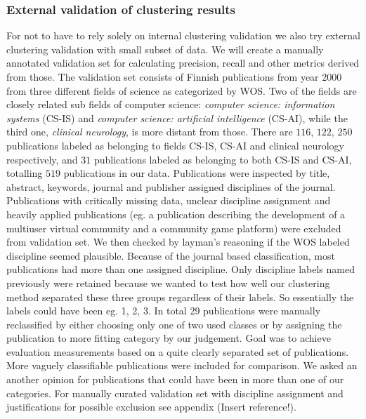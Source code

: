 \subsubsection{External validation of clustering results}
For not to have to rely solely on internal clustering validation we
also try external clustering validation with small subset of data.
We will create a manually annotated validation set for calculating
precision, recall and other metrics derived from those.
The validation set consists of Finnish publications from year 2000
from three different fields of science as categorized by WOS.
Two of the fields are closely related sub fields of computer
science: \emph{computer science: information systems} (CS-IS) and 
\emph{computer science: 
artificial intelligence} (CS-AI), while the third one, 
\emph{clinical neurology}, is more distant from those. There are 
$116$, $122$, $250$ publications labeled as belonging to fields 
CS-IS, CS-AI and clinical neurology respectively, and $31$ 
publications labeled as belonging to both CS-IS and CS-AI, 
totalling $519$ publications in our data.
Publications were inspected by title, abstract, keywords, journal
and publisher assigned disciplines of the journal. Publications
with critically missing data, unclear discipline assignment and
heavily applied publications (eg. a publication describing the 
development of a multiuser virtual community and a community game 
platform) were excluded from validation set. 
We then checked by layman's reasoning if the WOS labeled 
discipline seemed plausible. Because of the journal based 
classification, most publications had more than one 
assigned discipline. Only discipline labels named 
previously were retained because we wanted to test 
how well our clustering method separated these three 
groups regardless of their labels. So essentially the 
labels could have been eg. 1, 2, 3.
In total 29 publications were manually reclassified by either
choosing only one of two used classes or by assigning the 
publication to more fitting category by our judgement.
Goal was to achieve evaluation measurements based on a quite 
clearly separated set of publications. More vaguely classifiable
publications were included for comparison. We asked an another 
opinion for publications that could have been in more 
than one of our categories. For manually curated validation set 
with discipline assignment and justifications for
possible exclusion see appendix (Insert reference!).

